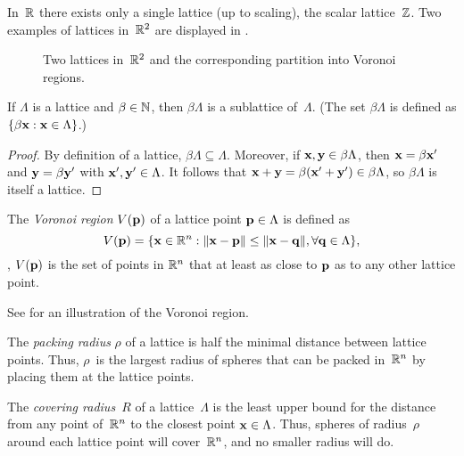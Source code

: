 \begin{example}
  \label{ex:scalarlattice}
  In~$\mathbb{R}$ there exists only a single lattice (up to scaling), the scalar
  lattice~$\mathbb{Z}$. Two examples of lattices in~$\mathbb{R}^2$ are displayed in
  .
\end{example}
\begin{figure}[tbp]
  \centerline{%
  \hfil
  }
  \caption{Two lattices in~$\mathbb{R}^2$ and the corresponding partition into Voronoi
  regions.}
  \label{fig:r2lattices}
\end{figure}
\begin{proposition}
  \label{prop:intsublattice}
  If $\Lambda$ is a lattice and $\beta \in {\mathbb{N}}$, then $\beta \Lambda$ is a
  sublattice of~$\Lambda$. (The set $\beta \Lambda$ is defined as $\{ \beta \mathbf{x} :
  \mathbf{x} \in \Lambda\}$.)
\end{proposition}

\begin{proof}
  By definition of a lattice, $\beta \Lambda \subseteq \Lambda$. Moreover, if
  $\mathbf{x}, \mathbf{y} \in \beta \Lambda$, then $\mathbf{x} = \beta \mathbf{x}'$ and $\mathbf{y} = \beta \mathbf{y}'$ with
  $\mathbf{x}', \mathbf{y}' \in \Lambda$. It follows that $\mathbf{x} + \mathbf{y} = \beta (\mathbf{x}' + \mathbf{y}') \in \beta
  \Lambda$, so $\beta\Lambda$ is itself a lattice.
\end{proof}

\begin{definition}
  The \emph{Voronoi region} $V(\mathbf{p})$ of a lattice point $\mathbf{p} \in \Lambda$ is
  defined as
  \begin{equation*}
    V(\mathbf{p}) = \{\mathbf{x} \in \mathbb{R}^n : \|\mathbf{x} - \mathbf{p}\| \le \|\mathbf{x} - \mathbf{q}\|, \forall \mathbf{q} \in
    \Lambda\},
  \end{equation*}
  \ie, $V(\mathbf{p})$ is the set of points in $\mathbb{R}^n$ that at least as close to $\mathbf{p}$ as
  to any other lattice point.
\end{definition}
See  for an illustration of the Voronoi region.

\begin{definition}
  The \emph{packing radius} $\rho$ of a lattice is half the minimal distance
  between lattice points. Thus, $\rho$~is the largest radius of spheres that can
  be packed in~$\mathbb{R}^n$ by placing them at the lattice points.
\end{definition}

\begin{definition}
  The \emph{covering radius}~$R$ of a lattice~$\Lambda$ is the least upper
  bound for the distance from any point of~$\mathbb{R}^n$ to the closest point $\mathbf{x} \in
  \Lambda$. Thus, spheres of radius~$\rho$ around each lattice point will
  cover~$\mathbb{R}^n$, and no smaller radius will do.~\cite{ConwayS1988}
\end{definition}

